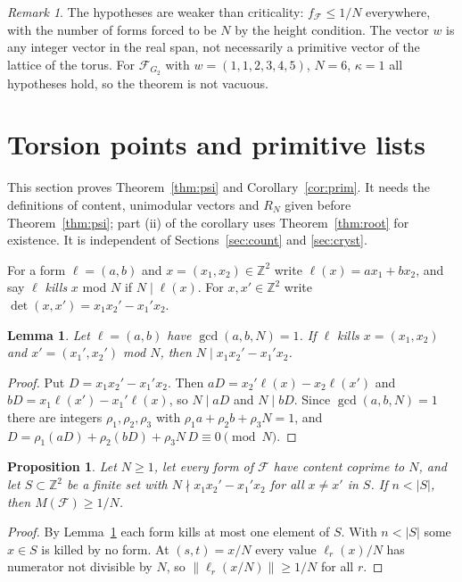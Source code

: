 \documentclass[11pt]{amsart}
\newtheorem{lemma}[theorem]{Lemma}
\newtheorem{proposition}[theorem]{Proposition}
\theoremstyle{definition}
\theoremstyle{remark}
\newtheorem{remark}[theorem]{Remark}
\newcommand{\Z}{\mathbb{Z}}
\newcommand{\dist}[1]{\lVert #1\rVert}
\begin{document}
\begin{remark}
The hypotheses are weaker than criticality: $f_{\mathcal F}\le1/N$ everywhere, with the number of forms forced to be $N$ by the height condition. The vector $w$ is any integer vector in the real span, not necessarily a primitive vector of the lattice of the torus. For $\mathcal F_{G_2}$ with $w=(1,1,2,3,4,5)$, $N=6$, $\kappa=1$ all hypotheses hold, so the theorem is not vacuous.
\end{remark}

\section{Torsion points and primitive lists}\label{sec:psi}

This section proves Theorem~\ref{thm:psi} and Corollary~\ref{cor:prim}. It needs the definitions of content, unimodular vectors and $R_N$ given before Theorem~\ref{thm:psi}; part (ii) of the corollary uses Theorem~\ref{thm:root} for existence. It is independent of Sections~\ref{sec:count} and \ref{sec:cryst}.

For a form $\ell=(a,b)$ and $x=(x_1,x_2)\in\Z^2$ write $\ell(x)=ax_1+bx_2$, and say $\ell$ \emph{kills} $x$ mod $N$ if $N\mid\ell(x)$. For $x,x'\in\Z^2$ write $\det(x,x')=x_1x_2'-x_1'x_2$.

\begin{lemma}\label{lem:det}
Let $\ell=(a,b)$ have $\gcd(a,b,N)=1$. If $\ell$ kills $x=(x_1,x_2)$ and $x'=(x_1',x_2')$ mod $N$, then $N\mid x_1x_2'-x_1'x_2$.
\end{lemma}
\begin{proof}
Put $D=x_1x_2'-x_1'x_2$. Then $aD=x_2'\ell(x)-x_2\ell(x')$ and $bD=x_1\ell(x')-x_1'\ell(x)$, so $N\mid aD$ and $N\mid bD$. Since $\gcd(a,b,N)=1$ there are integers $\rho_1,\rho_2,\rho_3$ with $\rho_1a+\rho_2b+\rho_3N=1$, and $D=\rho_1(aD)+\rho_2(bD)+\rho_3N\,D\equiv0\pmod N$.
\end{proof}

\begin{proposition}\label{prop:pigeon}
Let $N\ge1$, let every form of $\mathcal F$ have content coprime to $N$, and let $S\subset\Z^2$ be a finite set with $N\nmid x_1x_2'-x_1'x_2$ for all $x\ne x'$ in $S$. If $n<|S|$, then $M(\mathcal F)\ge1/N$.
\end{proposition}
\begin{proof}
By Lemma~\ref{lem:det} each form kills at most one element of $S$. With $n<|S|$ some $x\in S$ is killed by no form. At $(s,t)=x/N$ every value $\ell_r(x)/N$ has numerator not divisible by $N$, so $\dist{\ell_r(x/N)}\ge1/N$ for all $r$.
\end{proof}
\end{document}
